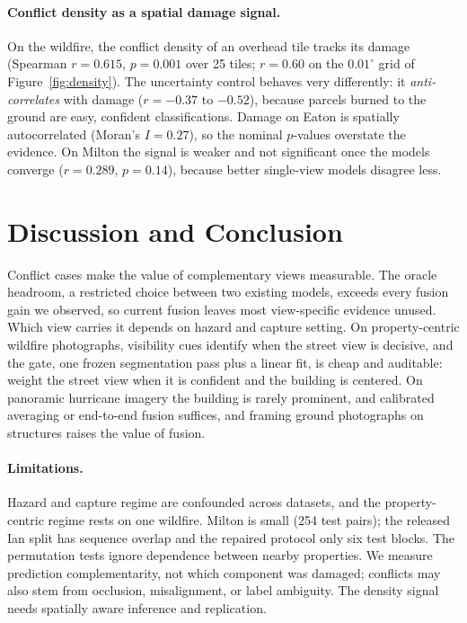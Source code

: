 \documentclass[sigconf]{acmart}
\begin{document}
\paragraph{Conflict density as a spatial damage signal.}
On the wildfire, the conflict density of an overhead tile tracks its damage
(Spearman $r=0.615$, $p=0.001$ over 25 tiles; $r=0.60$ on the $0.01^\circ$
grid of Figure~\ref{fig:density}). The uncertainty control behaves very
differently: it \emph{anti-correlates} with damage ($r=-0.37$ to $-0.52$),
because parcels burned to the ground are easy, confident classifications.
Damage on
Eaton is spatially autocorrelated (Moran's $I=0.27$),
so the nominal $p$-values overstate the evidence. On Milton the signal is
weaker and not significant once the models converge ($r=0.289$, $p=0.14$),
because better single-view models disagree less.

\section{Discussion and Conclusion}
Conflict cases make the value of complementary views measurable. The oracle
headroom, a restricted choice between two existing models, exceeds every
fusion gain we observed, so current fusion leaves most view-specific
evidence unused. Which view carries it depends on hazard and capture
setting. On property-centric wildfire photographs, visibility cues identify
when the street view is decisive, and the gate, one frozen segmentation
pass plus a linear fit, is cheap and auditable: weight the street view when
it is confident and the building is centered. On
panoramic hurricane imagery the building is rarely prominent, and
calibrated averaging or end-to-end fusion suffices, and framing ground
photographs on structures raises the value of fusion.

\paragraph{Limitations.}
Hazard and capture regime are confounded across datasets, and the
property-centric regime rests on one wildfire. Milton is small (254 test
pairs); the released Ian split has sequence overlap and the repaired
protocol only six test blocks. The permutation tests ignore dependence
between nearby properties. We measure prediction complementarity, not which
component was damaged; conflicts may also stem from occlusion,
misalignment, or label ambiguity. The density signal needs spatially aware inference and
replication.
\end{document}

